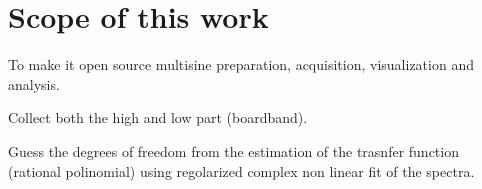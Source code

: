 \chapter{Scope of this work}


To make it open source multisine preparation, acquisition, visualization and analysis.

Collect both the high and low part (boardband).

Guess the degrees of freedom from the estimation of the trasnfer function (rational polinomial) using regolarized complex non linear fit of the spectra.

